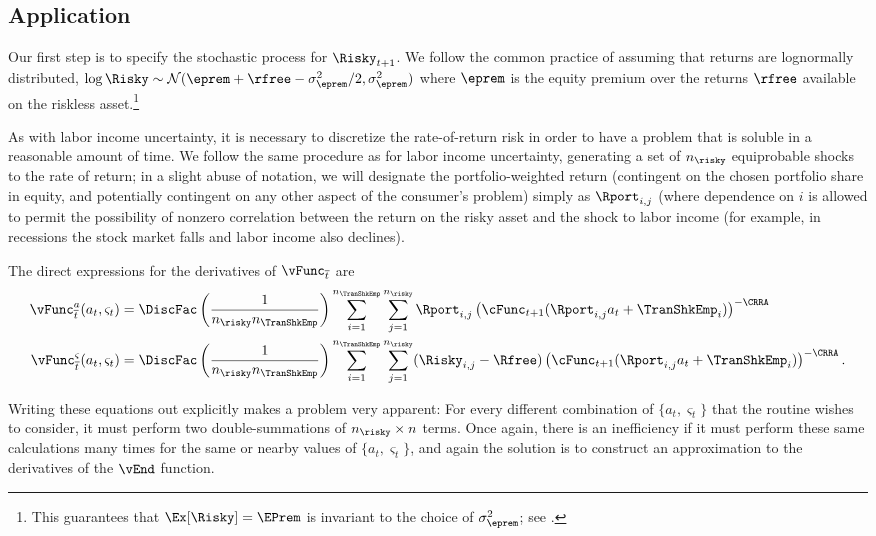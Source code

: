 \documentclass[titlepage, headings=optiontotocandhead]{\econtex}
\begin{document}
\subsection{Application}

Our first step is to specify the stochastic process for $\Risky_{t+1}$.
We follow the common practice of assuming that returns are
lognormally distributed, $\log \Risky \sim
\mathcal{N}(\eprem+\rfree-\sigma^{2}_{\eprem}/2,\sigma^{2}_{\eprem})$ where $\eprem$ is the equity premium
over the returns $\rfree$ available on the riskless asset.\footnote{This guarantees that $\Ex[\Risky] = \EPrem$ is invariant to the choice of $\sigma^{2}_{\eprem}$; see .}

As with labor income uncertainty, it is necessary to discretize the
rate-of-return risk in order to have a problem that is soluble in a
reasonable amount of time.  We follow the same procedure as for labor
income uncertainty, generating a set of $n_{\risky}$ equiprobable shocks to the
rate of return; in a slight abuse of notation, we will designate
the portfolio-weighted return (contingent on the
chosen portfolio share in equity, and potentially contingent on any other
aspect of the consumer's problem) simply as $\Rport_{i,j}$ (where dependence
on $i$ is allowed to permit the possibility of nonzero correlation
between the return on the risky asset and the shock to labor income (for example,
in recessions the stock market falls and labor income also declines).

The direct expressions for the derivatives of $\vEOPt$ are
\begin{equation}\begin{gathered}\begin{aligned}
      \vEOPt^{{a}}({a}_{t},\varsigma_{t})  & = \DiscFac \left(\frac{1}{n_{\risky} n_{\TranShkEmp}}\right)\sum_{i=1}^{n_{\TranShkEmp}}\sum_{j=1}^{n_{\risky} }\Rport_{i,j} \left(\cFunc_{t+1}(\Rport_{i,j}{a}_{t}+\TranShkEmp_{i})\right)^{-\CRRA}
      \\      \vEOPt^{\varsigma}({a}_{t},\varsigma_{t})  & = \DiscFac \left(\frac{1}{n_{\risky} n_{\TranShkEmp}}\right)\sum_{i=1}^{n_{\TranShkEmp}}\sum_{j=1}^{n_{\risky} }(\Risky_{i,j}-\Rfree)\left(\cFunc_{t+1}(\Rport_{i,j}{a}_{t}+\TranShkEmp_{i})\right)^{-\CRRA}.
    \end{aligned}\end{gathered}\end{equation}

Writing these equations out explicitly makes a problem very
apparent: For every different combination of $\{{a}_{t},\varsigma_{t}\}$
that the routine wishes to consider, it must perform two
double-summations of $n_{\risky} \times n$ terms.  Once again, there is an
inefficiency if it must perform these same calculations many times
for the same or nearby values of $\{{a}_{t},\varsigma_{t}\}$, and again
the solution is to construct an approximation to the derivatives of
the $\vEnd$ function.
\end{document}
